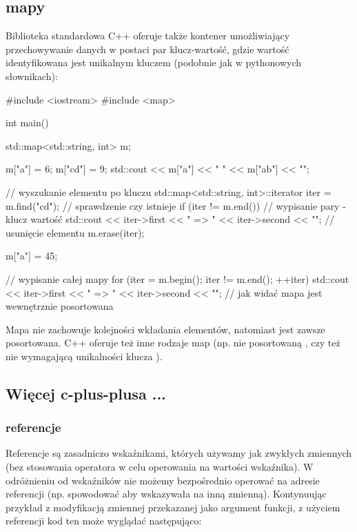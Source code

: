 \subsection{mapy}

Biblioteka standardowa C++ oferuje także kontener umożliwiający przechowywanie danych w postaci par klucz-wartość, gdzie wartość identyfikowana jest unikalnym kluczem (podobnie jak w pythonowych słownikach):

\begin{CodeFrame*}[cpp]{}
#include <iostream>
#include <map>

int main() {
    std::map<std::string, int> m;
    
    m["a"] = 6;
    m["cd"] = 9;
    std::cout << m["a"] << " " << m["ab"] << "\n";
    
    // wyszukanie elementu po kluczu
    std::map<std::string, int>::iterator iter = m.find("cd");
    // sprawdzenie czy istnieje
    if (iter != m.end()) {
        // wypisanie pary - klucz wartość
        std::cout << iter->first << " => " << iter->second << "\n";
        // usunięcie elementu
        m.erase(iter);
    }
    
    m["a"] = 45;
    
    // wypisanie całej mapy
    for (iter = m.begin(); iter != m.end(); ++iter)
        std::cout << iter->first << " => " << iter->second << "\n";
    // jak widać mapa jest wewnętrznie posortowana
}
\end{CodeFrame*}

Mapa  nie zachowuje kolejności wkładania elementów, natomiast jest zawsze posortowana.
C++ oferuje też inne rodzaje map (np. nie posortowaną , czy też nie wymagającą unikalności klucza ).


\subsection{Więcej c-plus-plusa ...}

\subsubsection{referencje}

Referencje są zasadniczo wskaźnikami, których używamy jak zwykłych zmiennych (bez stosowania operatora \cpp{*} w celu operowania na wartości wskaźnika).
W odróżnieniu od wskaźników nie możemy bezpośrednio operować na adresie referencji (np. spowodować aby wskazywała na inną zmienną).
Kontynuując przykład z modyfikacją zmiennej przekazanej jako argument funkcji, z użyciem referencji kod ten może wyglądać następująco:

